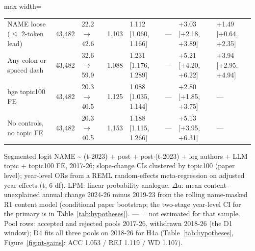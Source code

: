 \begin{landscape}
\begin{table}[p]
\begin{adjustbox}{max width=\linewidth}
\begin{tabular}{l r l l l l l l}
NAME loose ($\leq$ 2-token lead) & 43,482 & 22.2 $\rightarrow$ 42.6 & 1.103 & 1.112 [1.060, 1.166] & --- & +3.03 [+2.18, +3.89] & +1.49 [+0.64, +2.35] \\
Any colon or spaced dash & 43,482 & 32.6 $\rightarrow$ 59.9 & 1.088 & 1.231 [1.176, 1.289] & --- & +5.21 [+4.20, +6.22] & +3.94 [+2.95, +4.94] \\
bge topic100 FE & 43,482 & 20.3 $\rightarrow$ 40.5 & 1.125 & 1.088 [1.035, 1.144] & --- & +2.80 [+1.85, +3.75] & --- \\
No controls, no topic FE & 43,482 & 20.3 $\rightarrow$ 40.5 & 1.153 & 1.188 [1.115, 1.266] & --- & +5.13 [+3.95, +6.31] & --- \\
\bottomrule
\end{tabular}
\end{adjustbox}
\par\smallskip
\parbox{\linewidth}{\scriptsize Segmented logit NAME \textasciitilde{} (t-2023) + post + post$\cdot$(t-2023) + log authors + LLM topic + topic100 FE, 2017-26; slope-change CIs clustered by topic100 (paper level); year-level ORs from a REML random-effects meta-regression on adjusted year effects (t, 6 df). LPM: linear probability analogue. $\Delta$u: mean content-unexplained annual change 2024-26 minus 2019-23 from the rolling name-masked R1 content model (conditional paper bootstrap; the two-stage year-level CI for the primary is in Table~\ref{tab:hypotheses}). --- = not estimated for that sample. Pool rows: accepted and rejected pools 2017-26, withdrawn 2018-26 (the D1 window); D4 fits all three pools on 2018-26 for H4a (Table~\ref{tab:hypotheses}, Figure~\ref{fig:nt-gains}: ACC 1.053 / REJ 1.119 / WD 1.107).}
\end{table}
\end{landscape}
